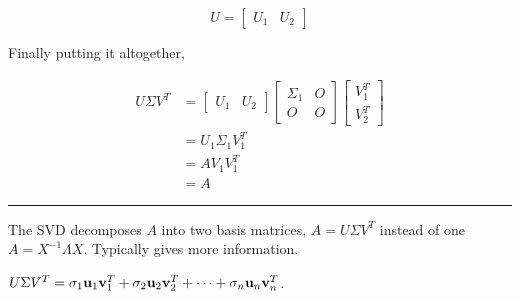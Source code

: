 \begin{questions}
\[ U =  \begin{bmatrix} U_1 &  U_2  \end{bmatrix}  \]

 
 Finally putting it altogether, 
 
\begin{align*}
U \Sigma V^T   &=   \begin{bmatrix} U_1 &  U_2  \end{bmatrix}  \begin{bmatrix} \Sigma_1 & O \\ O & O \end{bmatrix} \begin{bmatrix} V_1^T \\  V_2^T  \end{bmatrix}\\
&= U_1 \Sigma_1 V_1^T \\
&= A V_1V_1^T\\
&=A
\end{align*}

\rule[0.001in]{\textwidth}{0.00025in}





\question The SVD decomposes $A$ into two basis matrices, $A = U \Sigma V^T$  instead of one $A = X^{-1} \Lambda X$.  Typically gives more information.  


\question $U \Sigma V^T = \sigma_1 {\bf u}_1 {\bf v}_1^T + \sigma_2 {\bf u}_2 {\bf v}_2^T + \cdots + \sigma_n {\bf u}_n {\bf v}_n^T$.












	






\end{questions}
